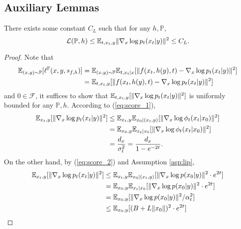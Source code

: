 \documentclass[11pt]{article}
\numberwithin{equation}{section}
\renewcommand{\P}{\mathbb{P}}
\renewcommand{\eqref}[1]{(\ref{#1})}
\begin{document}
\subsection{Auxiliary Lemmas}

\begin{lemma}\label{lem:bound L(P,h)}
    There exists some constant $C_L$ such that for any $h,\P$, 
    \begin{equation}
        \mathcal{L}(\P,h)\leq\E_{t,x_t,y}\|\nabla_x\log p_t(x_t|y)\|^2\leq C_L.
    \end{equation} 
\end{lemma}

\begin{proof}
    Note that
    \begin{equation}
        \begin{aligned}
            \E_{(x,y)\sim\P}[\ell^\P(x,y,s_{f,h})]
            &=\E_{(x,y)\sim\P}\E_{t,x_t|x}[\|f(x_t,h(y),t)-\nabla_x\log p_t(x_t|y)\|^2] \\
            &= \E_{t,x_t,y}[\|f(x_t,h(y),t)-\nabla_x\log p_t(x_t|y)\|^2]
        \end{aligned}
    \end{equation}
    and $0\in\mathcal{F}$, it suffices to show that $\mathbb{E}_{t,x_t,y}[\|\nabla_x\log p_t(x_t|y)\|^2]$ is uniformly bounded for any $\P,h$.
    According to \eqref{eq:score_1}, 
    \begin{equation}
        \begin{aligned}
        \mathbb{E}_{x_t,y}[\|\nabla_x\log p_t(x_t|y)\|^2]
        &\leq \mathbb{E}_{x_t,y}\mathbb{E}_{x_0|(x_t,y)}[\|\nabla_x\log \phi_t(x_t|x_0)\|^2] \\
        &= \mathbb{E}_{x_0,y}\mathbb{E}_{x_t|x_0}[\|\nabla_x\log \phi_t(x_t|x_0)\|^2] \\
        &=\frac{d_x}{\sigma_t^2}=\frac{d_x}{1-e^{-2t}}.
        \end{aligned}
    \end{equation}
    On the other hand, by \eqref{eq:score_2} and Assumption \ref{asp:lip},
    \begin{equation}
        \begin{aligned}
        \E_{x_t,y}[\|\nabla_x\log p_t(x_t|y)\|^2]
        &\leq \E_{x_t,y}\E_{x_0|(x_t,y)}[\|\nabla_x\log p(x_0|y)\|^2\cdot e^{2t}] \\
        &= \E_{x_0,y}\E_{x_t|x_0}[\|\nabla_x\log p(x_0|y)\|^2\cdot e^{2t}] \\
        &=\E_{x_0,y}[\|\nabla_x\log p(x_0|y)\|^2/\alpha_t^2] \\
        &\leq\E_{x_0,y}[(B+L\|x_0\|)^2\cdot e^{2t}] \\

\end{aligned}
\end{equation}
\end{proof}
\end{document}
